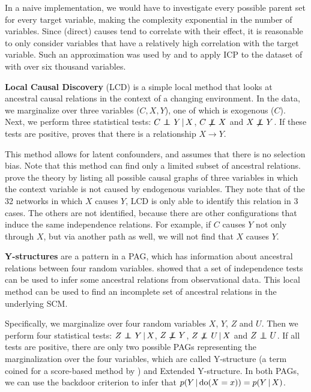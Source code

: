 In a naive implementation, we would have to investigate every possible parent set for every target variable, making the complexity exponential in the number of variables. Since (direct) causes tend to correlate with their effect, it is reasonable to only consider variables that have a relatively high correlation with the target variable. Such an approximation was used by \citet{peters2016causal} and \citet{meinshausen2016methods} to apply ICP to the dataset of \citet{kemmeren2014large} with over six thousand variables.

\textbf{Local Causal Discovery} (LCD) is a simple local method that looks at ancestral causal relations in the context of a changing environment. In the data, we marginalize over three variables ($C, X, Y$), one of which is exogenous ($C$). Next, we perform three statistical tests: ${C} \operatorname*{{\,\perp\mkern-12mu\perp\,}}_{} {Y} \,|\, {X}$, $C \operatorname*{{\,\not\mkern-1mu\perp\mkern-12mu\perp\,}} X$ and $X \operatorname*{{\,\not\mkern-1mu\perp\mkern-12mu\perp\,}} Y$. If these tests are positive, \citep{cooper1997simple} proves that there is a relationship $X \to Y$. 

This method allows for latent confounders, and assumes that there is no selection bias. Note that this method can find only a limited subset of ancestral relations. \citep{cooper1997simple} prove the theory by listing all possible causal graphs of three variables in which the context variable is not caused by endogenous variables. They note that of the 32 networks in which $X$ causes $Y$, LCD is only able to identify this relation in 3 cases. The others are not identified, because there are other configurations that induce the same independence relations. For example, if $C$ causes $Y$ not only through $X$, but via another path as well, we will not find that $X$ causes $Y$.  


\textbf{Y-structures} are a pattern in a PAG, which has information about ancestral relations between four random variables. \citet{mooij2015empirical} showed that a set of independence tests can be used to infer some ancestral relations from observational data. This local method can be used to find an incomplete set of ancestral relations in the underlying SCM. 

Specifically, we marginalize over four random variables $X$, $Y$, $Z$ and $U$. Then we perform four statistical tests: ${Z} \operatorname*{{\,\perp\mkern-12mu\perp\,}}_{} {Y} \,|\, {X}$, $Z \operatorname*{{\,\not\mkern-1mu\perp\mkern-12mu\perp\,}} Y$, ${Z} \operatorname*{{\,\not\mkern-1mu\perp\mkern-12mu\perp\,}}_{} {U} \,|\, {X}$ and $Z \operatorname*{{\,\perp\mkern-12mu\perp\,}} U$. If all tests are positive, there are only two possible PAGs representing the marginalization over the four variables, which are called Y-structure (a term coined for a score-based method by \citet{mani2006bayesian}) and Extended Y-structure. In both PAGs, we can use the backdoor criterion\citep{pearl2009causality} to infer that $p(Y\,|\, \mathrm{do}(X=x))=p(Y\,|\, X)$.

